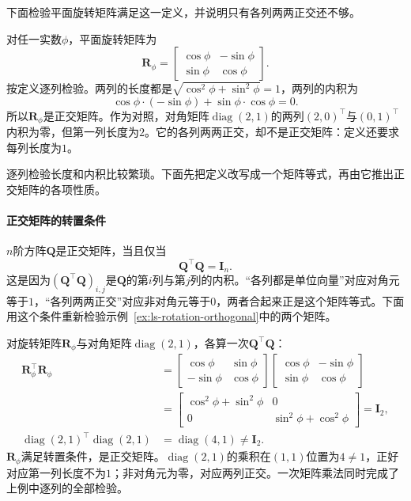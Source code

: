 下面检验平面旋转矩阵满足这一定义，并说明只有各列两两正交还不够。
\begin{example}[平面旋转是正交矩阵]
\label{ex:ls-rotation-orthogonal}
对任一实数$\phi$，平面旋转矩阵为
\[
 \bm R_\phi=\begin{bmatrix}\cos\phi&-\sin\phi\\\sin\phi&\cos\phi\end{bmatrix}.
\]
按定义逐列检验。两列的长度都是$\sqrt{\cos^2\phi+\sin^2\phi}=1$，两列的内积为
\[
 \cos\phi\cdot(-\sin\phi)+\sin\phi\cdot\cos\phi=0.
\]
所以$\bm R_\phi$是正交矩阵。作为对照，对角矩阵$\operatorname{diag}(2,1)$的两列$(2,0)^\top$与$(0,1)^\top$内积为零，但第一列长度为$2$。它的各列两两正交，却不是正交矩阵：定义还要求每列长度为$1$。
\end{example}
逐列检验长度和内积比较繁琐。下面先把定义改写成一个矩阵等式，再由它推出正交矩阵的各项性质。

\paragraph{正交矩阵的转置条件}
$n$阶方阵$\bm Q$是正交矩阵，当且仅当
\[
 \bm Q^\top\bm Q=\bm I_n.
\]
这是因为$(\bm Q^\top\bm Q)_{i,j}$是$\bm Q$的第$i$列与第$j$列的内积。“各列都是单位向量”对应对角元等于$1$，“各列两两正交”对应非对角元等于$0$，两者合起来正是这个矩阵等式。下面用这个条件重新检验示例~\ref{ex:ls-rotation-orthogonal}中的两个矩阵。
\begin{example}[用转置条件检验正交矩阵]
\label{ex:ls-orthogonality-by-transpose}
对旋转矩阵$\bm R_\phi$与对角矩阵$\operatorname{diag}(2,1)$，各算一次$\bm Q^\top\bm Q$：
\[
 \begin{aligned}
 \bm R_\phi^\top\bm R_\phi
 &=\begin{bmatrix}\cos\phi&\sin\phi\\-\sin\phi&\cos\phi\end{bmatrix}
   \begin{bmatrix}\cos\phi&-\sin\phi\\\sin\phi&\cos\phi\end{bmatrix}\\
 &=\begin{bmatrix}\cos^2\phi+\sin^2\phi&0\\0&\sin^2\phi+\cos^2\phi\end{bmatrix}
 =\bm I_2,\\
 \operatorname{diag}(2,1)^\top\operatorname{diag}(2,1)&=\operatorname{diag}(4,1)\neq\bm I_2.
 \end{aligned}
\]
$\bm R_\phi$满足转置条件，是正交矩阵。$\operatorname{diag}(2,1)$的乘积在$(1,1)$位置为$4\neq1$，正好对应第一列长度不为$1$；非对角元为零，对应两列正交。一次矩阵乘法同时完成了上例中逐列的全部检验。
\end{example}

